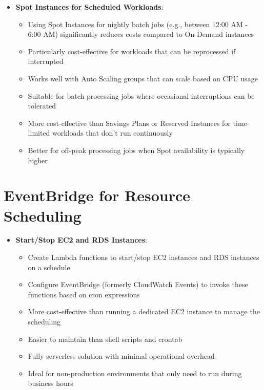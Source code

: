 \documentclass[11pt,a4paper]{report}
\begin{document}
\begin{itemize}
\begin{itemize}
  \item Allows precise specification of desired capacity at specific times
  \item Can be configured to scale both up and down according to schedule
  \item Ideal for workloads with known time-based patterns like batch processing jobs
  \item Provides the simplest solution for workloads with regular, predictable traffic patterns
  \item Can be combined with dynamic scaling policies to handle both predictable and unexpected load changes
\end{itemize}
  \item \textbf{Spot Instances for Scheduled Workloads}:
\begin{itemize}
  \item Using Spot Instances for nightly batch jobs (e.g., between 12:00 AM - 6:00 AM) significantly reduces costs compared to On-Demand instances
  \item Particularly cost-effective for workloads that can be reprocessed if interrupted
  \item Works well with Auto Scaling groups that can scale based on CPU usage
  \item Suitable for batch processing jobs where occasional interruptions can be tolerated
  \item More cost-effective than Savings Plans or Reserved Instances for time-limited workloads that don't run continuously
  \item Better for off-peak processing jobs when Spot availability is typically higher
\end{itemize}
\end{itemize}


\section{EventBridge for Resource Scheduling}

\begin{itemize}
  \item \textbf{Start/Stop EC2 and RDS Instances}:
\begin{itemize}
  \item Create Lambda functions to start/stop EC2 instances and RDS instances on a schedule
  \item Configure EventBridge (formerly CloudWatch Events) to invoke these functions based on cron expressions
  \item More cost-effective than running a dedicated EC2 instance to manage the scheduling
  \item Easier to maintain than shell scripts and crontab
  \item Fully serverless solution with minimal operational overhead
  \item Ideal for non-production environments that only need to run during business hours
\end{itemize}
\end{itemize}
\end{document}
